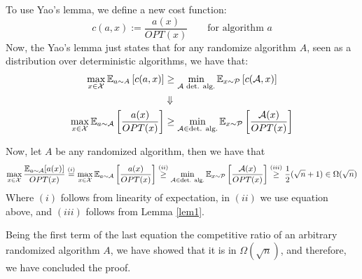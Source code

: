 \documentclass[11pt]{article}
\begin{document}
\begin{enumerate}
    To use Yao's lemma, we define a new cost function:
    \begin{equation*}
            c(a,x) := \frac{a(x)}{OPT(x)}\qquad \text{for algorithm $a$}    
    \end{equation*}
    Now, the Yao's lemma just states that for any randomize algorithm $A$, seen as a distribution over deterministic algorithms, we have that:
    \begin{align*}
        \max_{x\in \mathcal{X}} \mathbb{E}_{a\sim A }\left[c(a,x)\right] &\geq \min_{\mathcal{A} \text{ det. alg.}}\mathbb{E}_{x\sim \mathcal{P}}\left[c(\mathcal{A},x)\right]\\
        &\Downarrow\\
        \max_{x \in \mathcal{X}} \mathbb{E}_{a\sim \mathcal{A}} \left[\frac{a(x)}{OPT(x)}\right] &\geq \min_{\mathcal{A} \in \text{det. alg.}}\mathbb{E}_{x \sim \mathcal{P}}\left[\frac{\mathcal{A}(x)}{OPT(x)}\right] 
    \end{align*}

    Now, let $A$ be any randomized algorithm, then we have that
    \begin{equation*}
        \max_{x \in \mathcal{X}} \frac{\mathbb{E}_{a\sim \mathcal{A}}[a(x)]}{OPT(x)} \stackrel{(i)}{=} \max_{x \in \mathcal{X}} \mathbb{E}_{a\sim \mathcal{A}} \left[\frac{a(x)}{OPT(x)}\right] \stackrel{(ii)}{\geq} \min_{\mathcal{A} \in \text{det. alg.}}\mathbb{E}_{x \sim \mathcal{P}}\left[\frac{\mathcal{A}(x)}{OPT(x)}\right] \stackrel{(iii)}{\geq} \frac{1}{2}(\sqrt{n} + 1) \in \Omega(\sqrt{n})
    \end{equation*}
    Where $(i)$ follows from linearity of expectation, in $(ii)$ we use equation above, and $(iii)$ follows from Lemma \ref{lem1}. 

    Being the first term of the last equation the competitive ratio of an arbitrary randomized algorithm $A$, we have showed that it is in $\Omega\left(\sqrt{n}\right)$, and therefore, we have concluded the proof.
\end{enumerate}
\end{document}
